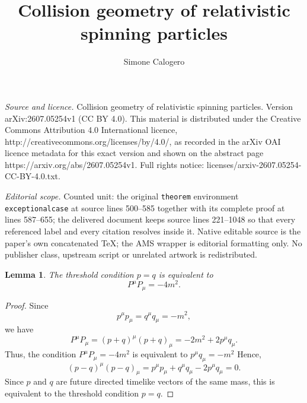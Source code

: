 \documentclass[10pt,a4paper]{amsart}
\newtheorem{lemma}[theorem]{Lemma}
\begin{document}
\title[Collision geometry of relativistic spinning particles]{Collision geometry of relativistic spinning particles}
\author{Simone Calogero}
\date{}
\maketitle
\noindent\emph{Source and licence.} Collision geometry of relativistic spinning particles. Version arXiv:2607.05254v1 (CC BY 4.0). This material is distributed under the Creative Commons Attribution 4.0 International licence, http://creativecommons.org/licenses/by/4.0/, as recorded in the arXiv OAI licence metadata for this exact version and shown on the abstract page https://arxiv.org/abs/2607.05254v1. Full rights notice: licenses/arxiv-2607.05254-CC-BY-4.0.txt.\par\smallskip
\noindent\textit{Editorial scope.} Counted unit: the original \texttt{theorem} environment \texttt{exceptionalcase} at source lines 500--585 together with its complete proof at lines 587--655; the delivered document keeps source lines 221--1048 so that every referenced label and every citation resolves inside it. Native editable source is the paper's own concatenated TeX; the AMS wrapper is editorial formatting only. No publisher class, upstream script or unrelated artwork is redistributed.
\begin{lemma}\label{simple}
The threshold condition $p=q$ is equivalent to
\[
P^\mu P_\mu=-4m^2.
\]
\end{lemma}
\begin{proof}
Since
\[
p^\mu p_\mu=q^\mu q_\mu=-m^2,
\]
we have
\[
P^\mu P_\mu=(p+q)^\mu(p+q)_\mu
=-2m^2+2p^\mu q_\mu.
\]
Thus, the condition $P^\mu P_\mu=-4m^2$ is equivalent to  $p^\mu q_\mu=-m^2$
Hence,
\[
(p-q)^\mu(p-q)_\mu
=
p^\mu p_\mu+q^\mu q_\mu-2p^\mu q_\mu
=0.
\]
Since $p$ and $q$ are future directed timelike vectors of the same mass, this is equivalent to the threshold condition $p=q$.
\end{proof}
\end{document}
